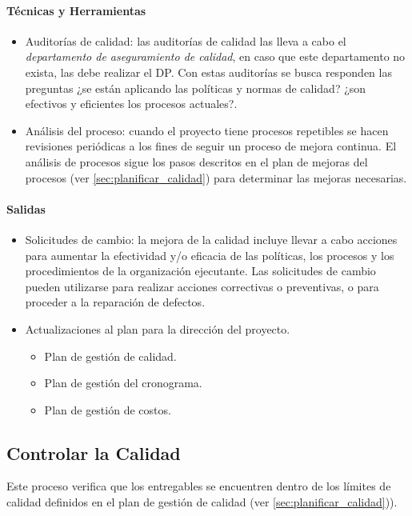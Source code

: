 \documentclass[a4paper,twosides]{article}
\newlength{\wideitemsep}
\let\olditem\item
\renewcommand{\item}{\setlength{\itemsep}{\wideitemsep}\olditem}
\begin{document}
\paragraph{Técnicas y Herramientas}
\begin{itemize}
\item Auditorías de calidad: las auditorías de calidad las lleva a cabo el \emph{departamento de aseguramiento de calidad}, en caso que este departamento no exista, las debe realizar el DP. Con estas auditorías se busca responden las preguntas ¿se están aplicando las políticas y normas de calidad? ¿son efectivos y eficientes los procesos actuales?.
\item Análisis del proceso: cuando el proyecto tiene procesos repetibles se hacen revisiones periódicas a los fines de seguir un proceso de mejora continua. El análisis de procesos sigue los pasos descritos en el plan de mejoras del procesos (ver \ref{sec:planificar_calidad}) para determinar las mejoras necesarias.
\end{itemize}

\paragraph{Salidas}
\begin{itemize}
\item Solicitudes de cambio: la mejora de la calidad incluye llevar a cabo acciones para aumentar la efectividad y/o eficacia de las políticas, los procesos y los procedimientos de la organización ejecutante. Las solicitudes de cambio pueden utilizarse para realizar acciones correctivas o preventivas, o para proceder a la reparación de defectos.
\item Actualizaciones al plan para la dirección del proyecto.
\begin{itemize}
\item Plan de gestión de calidad.
\item Plan de gestión del cronograma.
\item Plan de gestión de costos.
\end{itemize}
\end{itemize}

\subsection{Controlar la Calidad} \label{sec:controlar_calidad}
Este proceso verifica que los entregables se encuentren dentro de los límites de calidad definidos en el plan de gestión de calidad (ver \ref{sec:planificar_calidad})).
\end{document}
